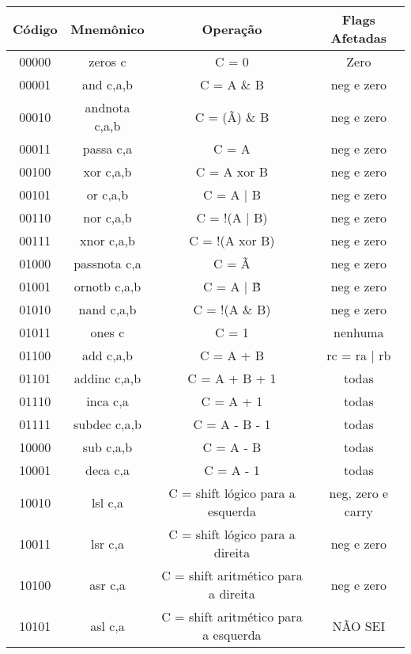\documentclass{article}
\begin{document}
  \begin{table}[H]
      \begin{center}
        \begin{tabular}[pos]{|c|c|c|c|} 
          \hline
          \cellcolor[gray]{0.9} \textbf{Código} & \cellcolor[gray]{0.9} \textbf{Mnemônico} & \cellcolor[gray]{0.9}\textbf{Operação} & \cellcolor[gray]{0.9}\textbf{Flags Afetadas} \\ \hline
          00000 & zeros c   &   C = 0   &   Zero \\ \hline
          00001 & and c,a,b   &   C = A \& B   &   neg e zero \\ \hline
          00010 & andnota c,a,b & C = (\~A) \& B & neg e zero\\ \hline
          00011 & passa c,a & C = A  &  neg e zero\\ \hline
          00100 & xor c,a,b & C = A xor B & neg e zero\\ \hline
          00101 & or c,a,b & C = A | B & neg e zero \\ \hline
          00110 & nor c,a,b & C = !(A | B) & neg e zero \\ \hline
          00111 & xnor c,a,b & C = !(A xor B) & neg e zero \\ \hline
          01000 & passnota c,a & C = \~A & neg e zero \\ \hline
          01001 & ornotb c,a,b & C = A | \~B & neg e zero \\ \hline
          01010 & nand c,a,b & C = !(A \& B) & neg e zero \\ \hline
          01011 & ones c & C = 1 & nenhuma \\ \hline
          01100 & add c,a,b & C = A + B & rc = ra | rb \\ \hline
          01101 & addinc c,a,b & C = A + B + 1 & todas \\ \hline
          01110 & inca c,a & C = A + 1 & todas\\ \hline
          01111 & subdec c,a,b & C = A - B - 1 & todas \\ \hline
          10000 & sub c,a,b & C = A - B &  todas\\ \hline
          10001 & deca c,a & C = A - 1 & todas \\ \hline
          10010 & lsl c,a & C = shift lógico para a esquerda & neg, zero e carry \\ \hline
          10011 & lsr c,a & C = shift lógico para a direita & neg e zero \\ \hline
          10100 & asr c,a & C = shift aritmético para a direita & neg e zero \\ \hline
          10101 & asl c,a & C = shift aritmético para a esquerda & NÃO SEI \\ \hline
        \end{tabular}
      \end{center}
    \end{table}
  
\end{document}
